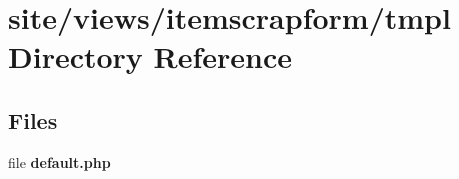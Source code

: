 \section{site/views/itemscrapform/tmpl Directory Reference}
\label{dir_7c7d8098cce13351f4b6d619478cc2c1}
\subsection*{Files}
\begin{DoxyCompactItemize}
\item 
file \textbf{ default.\+php}
\end{DoxyCompactItemize}

